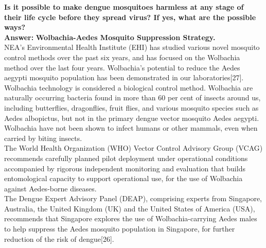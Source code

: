 \documentclass[11pt]{exam}
\begin{document}
\begin{questions}

\newpage
\question
\label{12. Dengue: Incapaciating Ae.Agypti }
\textbf{Is it possible to make dengue mosquitoes harmless at any stage of their life cycle before they spread virus? If yes, what are the possible ways?}\\
\textbf{Answer:}  \textbf{Wolbachia-Aedes Mosquito Suppression Strategy.}\\

NEA’s Environmental Health Institute (EHI) has studied various novel mosquito control methods over the past six years, and has focused on the Wolbachia method over the last four years. Wolbachia’s potential to reduce the Aedes aegypti mosquito population has been demonstrated in our laboratories[27].\\ 

Wolbachia technology is considered a biological control method. Wolbachia are naturally occurring bacteria found in more than 60 per cent of insects around us, including butterflies, dragonflies, fruit flies, and various mosquito species such as Aedes albopictus, but not in the primary dengue vector mosquito Aedes aegypti. Wolbachia have not been shown to infect humans or other mammals, even when carried by biting insects.\\

The World Health Organization (WHO) Vector Control Advisory Group (VCAG) recommends carefully planned pilot deployment under operational conditions accompanied by rigorous independent monitoring and evaluation that builds entomological capacity to support operational use, for the use of Wolbachia against Aedes-borne diseases.\\

The Dengue Expert Advisory Panel (DEAP), comprising experts from Singapore, Australia, the United Kingdom (UK) and the United States of America (USA), recommends that Singapore explores the use of Wolbachia-carrying Aedes males to help suppress the Aedes mosquito population in Singapore, for further reduction of the risk of dengue[26].\\


\end{questions}
\end{document}
